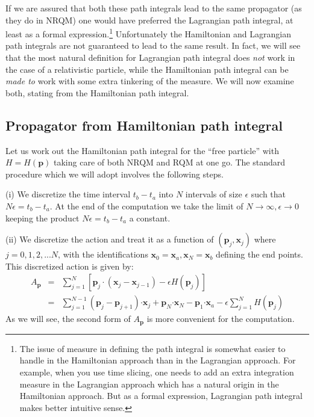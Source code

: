 \documentclass[12pt]{article}
\begin{document}
 If we are assured that both these path integrals lead to the same propagator (as they do in NRQM) one would have  preferred the Lagrangian path integral, at least as a formal expression.\footnote{The issue of measure in defining the path integral is somewhat easier to handle in the Hamiltonian approach than in the Lagrangian approach. For example, when you use time slicing, one needs to add an extra integration measure in the Lagrangian approach which has a natural origin in the Hamiltonian approach. But as a formal expression, Lagrangian path integral makes better intuitive sense.} Unfortunately the Hamiltonian and Lagrangian path integrals are not guaranteed to lead to the same result. In fact, we will see that the most natural definition for Lagrangian path integral does \textit{not}  work in the case of a relativistic particle, while the Hamiltonian path integral can be \textit{made to} work with some extra tinkering of the measure. We will now examine both, stating from the Hamiltonian path integral. 
 
\subsection{Propagator from Hamiltonian path integral}\label{sec:hpi} 
 
Let us work out the Hamiltonian path integral for the ``free particle'' with $H=H(\bm{p})$ taking care of both NRQM and RQM at one go. The standard procedure which we will adopt involves the following steps. 

(i) We discretize the time interval $t_b-t_a$ into $N$ intervals of size $\epsilon$ such that $N\epsilon=t_b-t_a$. At the end of the computation we take the limit of $N\to\infty, \epsilon\to0$ keeping the product $N\epsilon=t_b-t_a$ a constant. 

(ii) We discretize  the action and treat it as a function of $(\bm{p}_j,\bm{x}_j)$ where $j=0,1,2,...N$, with the identifications $\bm{x}_0=\bm{x}_a,\bm{x}_N=\bm{x}_b$ defining the end points. This discretized action is given by:
\begin{eqnarray}
 A_{\bm{p}}&=&\sum_{j=1}^N \left[ \bm{p}_j\cdot (\bm{x}_j-\bm{x}_{j-1}) -\epsilon H(\bm{p}_j)\right]\nonumber\\
 &=& \sum_{j=1}^{N-1} \left( \bm{p}_j - \bm{p}_{j+1} \right)\bm{\cdot x}_j+ \bm{p}_N \bm{\cdot x}_N - \bm{p}_1\bm{\cdot x}_a - \epsilon \sum_{j=1}^{N} H(\bm{p}_j)
 \label{discaction}
\end{eqnarray} 
As we will see, the second form of  $A_{\bm{p}}$ is more convenient for the computation.
\end{document}
